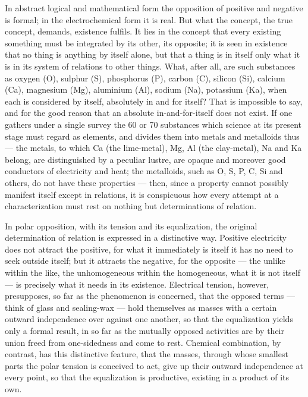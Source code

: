 \documentclass[12pt,a4paper]{book}
\begin{document}
In abstract logical and mathematical form the opposition of positive and
negative is formal; in the electrochemical form it is real. But what the
concept, the true concept, demands,
existence fulfils. It lies in the concept that every existing something must be
integrated by its other, its opposite; it is seen in existence that no thing is
anything by itself alone, but that a thing is in itself only what it is in its
system of relations to other things. What, after all, are such substances as
oxygen (O), sulphur (S), phosphorus (P), carbon (C), silicon (Si), calcium
(Ca), magnesium (Mg), aluminium (Al), sodium (Na), potassium (Ka), when each is
considered by itself, absolutely in and for itself? That is impossible to say,
and for the good reason that an absolute in-and-for-itself does not exist. If
one gathers under a single survey the 60 or 70 substances which science at its
present stage must regard as elements, and divides them into metals and
metalloids thus --- the metals, to which Ca (the lime-metal), Mg, Al (the
clay-metal), Na and Ka belong, are distinguished by a peculiar lustre, are
opaque and moreover good conductors of electricity and heat; the metalloids,
such as O, S, P, C, Si and others, do not have these properties --- then, since
a property cannot possibly manifest itself except in relations, it is
conspicuous how every attempt at a characterization must rest on nothing but
determinations of relation.

In polar opposition, with its tension and its equalization, the original
determination of relation is expressed in a distinctive way. Positive
electricity does not attract the positive, for what it immediately is itself it
has no need to seek outside itself; but it attracts the negative, for the
opposite --- the unlike within the like, the unhomogeneous within the
homogeneous, what it is not itself --- is precisely what it needs in its
existence. Electrical tension, however, presupposes, so far as the phenomenon
is concerned, that the opposed terms --- think of glass and sealing-wax ---
hold themselves as masses with a certain outward independence over against one
another, so that the equalization yields only a formal result, in so far as the
mutually opposed activities are by their union freed from one-sidedness and
come to rest. Chemical combination,
by contrast, has this distinctive feature, that the masses, through whose
smallest parts the polar tension is conceived to act, give up their outward
independence at every point, so that the equalization is productive, existing
in a product of its own.
\end{document}
